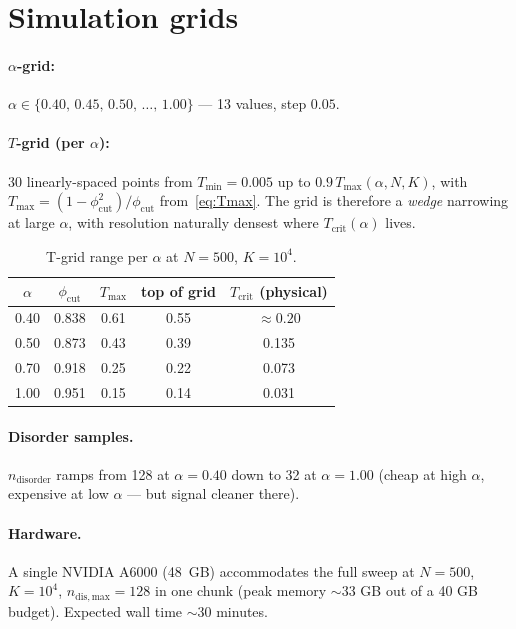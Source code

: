 \documentclass[11pt]{article}
\begin{document}
\section{Simulation grids}

\paragraph{$\alpha$-grid:} $\alpha \in \{0.40,\, 0.45,\, 0.50,\, \ldots,\, 1.00\}$ — 13 values, step $0.05$.

\paragraph{$T$-grid (per $\alpha$):} 30 linearly-spaced points from $T_{\min}=0.005$ up to $0.9\,T_{\max}(\alpha,N,K)$, with $T_{\max} = (1-\phi_{\mathrm{cut}}^2)/\phi_{\mathrm{cut}}$ from~\eqref{eq:Tmax}. The grid is therefore a \emph{wedge} narrowing at large $\alpha$, with resolution naturally densest where $T_{\mathrm{crit}}(\alpha)$ lives.

\begin{table}[h]
\centering
\caption{T-grid range per $\alpha$ at $N=500$, $K=10^4$.}
\begin{tabular}{ccccc}
\toprule
$\alpha$ & $\phi_{\mathrm{cut}}$ & $T_{\max}$ & top of grid & $T_{\mathrm{crit}}$ (physical) \\
\midrule
0.40 & 0.838 & 0.61 & 0.55 & $\approx 0.20$ \\
0.50 & 0.873 & 0.43 & 0.39 & 0.135 \\
0.70 & 0.918 & 0.25 & 0.22 & 0.073 \\
1.00 & 0.951 & 0.15 & 0.14 & 0.031 \\
\bottomrule
\end{tabular}
\end{table}

\paragraph{Disorder samples.}  $n_{\mathrm{disorder}}$ ramps from 128 at $\alpha=0.40$ down to 32 at $\alpha=1.00$ (cheap at high $\alpha$, expensive at low $\alpha$ — but signal cleaner there).

\paragraph{Hardware.}  A single NVIDIA A6000 (48~GB) accommodates the full sweep at $N=500$, $K=10^4$, $n_{\mathrm{dis,max}}=128$ in one chunk (peak memory $\sim$33 GB out of a 40 GB budget). Expected wall time $\sim$30 minutes.
\end{document}
